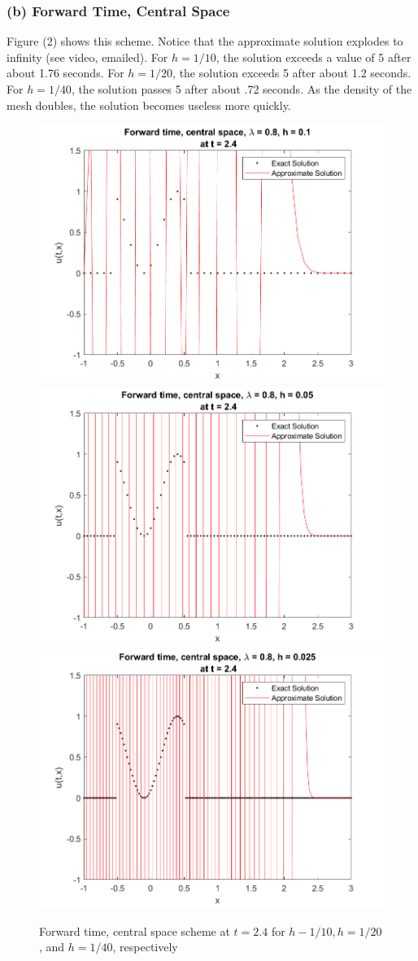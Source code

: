 \documentclass[12pt]{article}
\begin{document}
\subsubsection*{(b) Forward Time, Central Space}

Figure (2) shows this scheme. Notice that the approximate solution explodes to infinity  (see video, emailed). For $h=1/10$, the solution exceeds a value of 5 after about 1.76 seconds. For $h=1/20$, the solution exceeds 5 after about 1.2 seconds. For $h=1/40$, the solution passes 5 after about .72 seconds. As the density of the mesh doubles, the solution becomes useless more quickly.

\begin{figure}
	\centering
	\includegraphics[width=.6\linewidth]{./code/b_forward_time_central_space_h_one_10th.png}	\includegraphics[width=.6\linewidth]{./code/b_forward_time_central_space_h_one_20th.png}
	\includegraphics[width=.6\linewidth]{./code/b_forward_time_central_space_h_one_40th.png}
	\caption{Forward time, central space scheme at $t=2.4$ for $h-1/10, h=1/20$, and $h=1/40$, respectively}
\end{figure}
\end{document}
